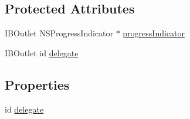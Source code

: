 \subsection*{Protected Attributes}
\begin{DoxyCompactItemize}
\item 
I\-B\-Outlet N\-S\-Progress\-Indicator $\ast$ \hyperlink{interface_progress_overlay_view_controller_a8d8847912bf02123b1ed3e8a70e6ed7e}{progress\-Indicator}
\item 
I\-B\-Outlet id \hyperlink{interface_progress_overlay_view_controller_a9f85cc570ea673f3b6001f8509d4bb11}{delegate}
\end{DoxyCompactItemize}
\subsection*{Properties}
\begin{DoxyCompactItemize}
\item 
id \hyperlink{interface_progress_overlay_view_controller_a8d9332fcd23523b1e2520b8765577423}{delegate}
\end{DoxyCompactItemize}


